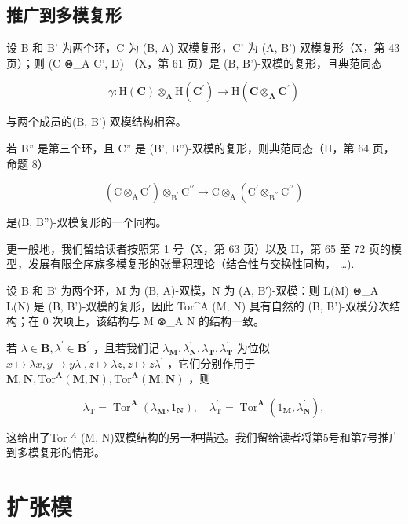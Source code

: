 \subsection{推广到多模复形}

设 B 和 B' 为两个环，C 为 (B, A)-双模复形，C' 为 (A, B')-双模复形（X，第 43 页）；则 (C ⊗\_A C', D) （X，第 61 页）是 (B, B')-双模的复形，且典范同态

\[
\gamma : \mathrm{H} (\mathbf {C}) \otimes_ {\mathbf {A}} \mathrm{H} (\mathbf {C} ^ {\prime}) \rightarrow \mathrm{H} (\mathbf {C} \otimes_ {\mathbf {A}} \mathbf {C} ^ {\prime})
\]

与两个成员的(B, B')-双模结构相容。

若 B'' 是第三个环，且 C'' 是 (B', B'')-双模的复形，则典范同态（II，第 64 页，命题 8）

\[
\left(\mathrm{C} \otimes_ {\mathrm{A}} \mathrm{C} ^ {\prime}\right) \otimes_ {\mathrm{B} ^ {\prime}} \mathrm{C} ^ {\prime \prime} \rightarrow \mathrm{C} \otimes_ {\mathrm{A}} \left(\mathrm{C} ^ {\prime} \otimes_ {\mathrm{B} ^ {\prime \prime}} \mathrm{C} ^ {\prime \prime}\right)
\]

是(B, B'')-双模复形的一个同构。

更一般地，我们留给读者按照第 1 号（X，第 63 页）以及 II，第 65 至 72 页的模型，发展有限全序族多模复形的张量积理论（结合性与交换性同构， \ldots).

设 B 和 B′ 为两个环，M 为 (B, A)-双模，N 为 (A, B′)-双模：则 L(M) ⊗\_A L(N) 是 (B, B')-双模的复形，因此 Tor\^{}A (M, N) 具有自然的 (B, B')-双模分次结构；在 0 次项上，该结构与 M ⊗\_A N 的结构一致。

若 \(\lambda\in\mathbf{B},\lambda^{\prime}\in\mathbf{B}^{\prime}\) ，且若我们记 \(\lambda_{\mathbf{M}},\lambda_{\mathbf{N}}^{\prime},\lambda_{\mathbf{T}},\lambda_{\mathbf{T}}^{\prime}\) 为位似 \(x\mapsto\lambda x,y\mapsto y\lambda^{\prime},z\mapsto\lambda z,z\mapsto z\lambda^{\prime}\) ，它们分别作用于 \(\mathbf{M},\mathbf{N},\mathrm{Tor}^{\mathbf{A}}(\mathbf{M},\mathbf{N}),\mathrm{Tor}^{\mathbf{A}}(\mathbf{M},\mathbf{N})\) ，则

\[
\lambda_ {\mathrm{T}} = \operatorname{Tor} ^ {\mathbf {A}} \left(\lambda_ {\mathbf {M}}, 1 _ {\mathbf {N}}\right), \quad \lambda_ {\mathrm{T}} ^ {\prime} = \operatorname{Tor} ^ {\mathbf {A}} \left(1 _ {\mathbf {M}}, \lambda_ {\mathbf {N}} ^ {\prime}\right),
\]

这给出了Tor \(^{A}\) (M, N)双模结构的另一种描述。我们留给读者将第5号和第7号推广到多模复形的情形。

\section{扩张模}

